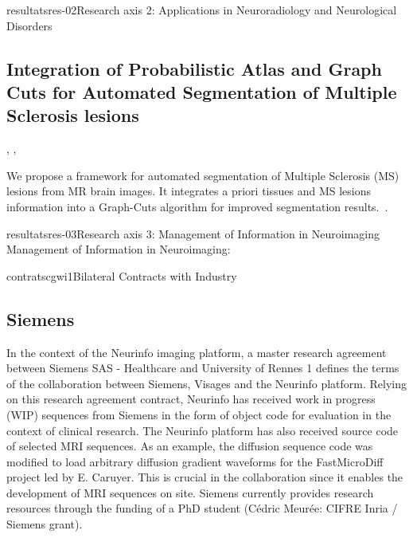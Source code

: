 \documentclass{ra2018}
\begin{document}
\begin{module}{resultats}{res-02}{Research axis 2: Applications in Neuroradiology and Neurological Disorders}
\subsection{Integration of Probabilistic Atlas and Graph Cuts for Automated Segmentation of Multiple Sclerosis lesions}
\begin{participants}
      ,
      ,
\end{participants}
We propose a framework for automated segmentation of Multiple Sclerosis (MS) lesions
from MR brain images. It integrates a priori tissues and MS lesions information into a Graph-Cuts algorithm for improved segmentation results.~\cite{galassi:hal-01823801}.

\end{module}

\begin{module}{resultats}{res-03}{Research axis 3: Management of Information in Neuroimaging}
Management of Information in Neuroimaging: 
\end{module}






\begin{module}{contrats}{cgwi1}{Bilateral Contracts with Industry}

\subsection{Siemens}
In the context of the Neurinfo imaging platform, a master research agreement between Siemens SAS - Healthcare and University of Rennes 1 defines the terms of the collaboration between Siemens, Visages and the Neurinfo platform. Relying on
this research agreement contract, Neurinfo has received work in progress (WIP) sequences from Siemens in the form of object code for evaluation in the context of clinical research. The Neurinfo platform has also received source code of selected MRI sequences. As an example, the diffusion sequence code was modified to load arbitrary diffusion gradient waveforms for the FastMicroDiff project led by E. Caruyer. This is crucial in the collaboration since it enables the development of MRI sequences on site. Siemens currently provides research resources through the funding of a PhD student (Cédric Meurée: CIFRE Inria / Siemens grant).

\end{module}
\end{document}
